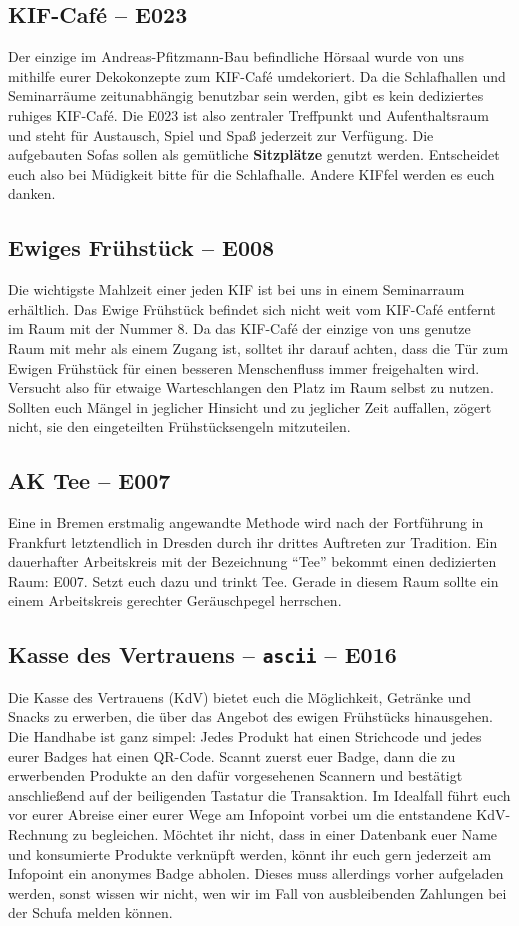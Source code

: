 \subsection*{KIF-Café -- E023}
Der einzige im Andreas-Pfitzmann-Bau befindliche Hörsaal wurde von uns mithilfe eurer Dekokonzepte zum KIF-Café umdekoriert.
Da die Schlafhallen und Seminarräume zeitunabhängig benutzbar sein werden, gibt es kein dediziertes ruhiges KIF-Café.
Die E023 ist also zentraler Treffpunkt und Aufenthaltsraum und steht für Austausch, Spiel und Spaß jederzeit zur Verfügung.
Die aufgebauten Sofas sollen als gemütliche \textbf{Sitzplätze} genutzt werden.
Entscheidet euch also bei Müdigkeit bitte für die Schlafhalle.
Andere KIFfel werden es euch danken.

\subsection*{Ewiges Frühstück -- E008}
Die wichtigste Mahlzeit einer jeden KIF ist bei uns in einem Seminarraum erhältlich.
Das Ewige Frühstück befindet sich nicht weit vom KIF-Café entfernt im Raum mit der Nummer 8.
Da das KIF-Café der einzige von uns genutze Raum mit mehr als einem Zugang ist, solltet ihr darauf achten, dass die Tür zum Ewigen Frühstück für einen besseren Menschenfluss immer freigehalten wird.
Versucht also für etwaige Warteschlangen den Platz im Raum selbst zu nutzen.
Sollten euch Mängel in jeglicher Hinsicht und zu jeglicher Zeit auffallen, zögert nicht, sie den eingeteilten Frühstücksengeln mitzuteilen.

\subsection*{AK Tee -- E007}
Eine in Bremen erstmalig angewandte Methode wird nach der Fortführung in Frankfurt letztendlich in Dresden durch ihr drittes Auftreten zur Tradition.
Ein dauerhafter Arbeitskreis mit der Bezeichnung \enquote{Tee} bekommt einen dedizierten Raum: E007.
Setzt euch dazu und trinkt Tee.
Gerade in diesem Raum sollte ein einem Arbeitskreis gerechter Geräuschpegel herrschen.

\subsection*{Kasse des Vertrauens -- \texttt{ascii} -- E016}
Die Kasse des Vertrauens (KdV) bietet euch die Möglichkeit, Getränke und Snacks zu erwerben, die über das Angebot des ewigen Frühstücks hinausgehen.
Die Handhabe ist ganz simpel: Jedes Produkt hat einen Strichcode und jedes eurer Badges hat einen QR-Code.
Scannt zuerst euer Badge, dann die zu erwerbenden Produkte an den dafür vorgesehenen Scannern und bestätigt anschließend auf der beiligenden Tastatur die Transaktion.
Im Idealfall führt euch vor eurer Abreise einer eurer Wege am Infopoint vorbei um die entstandene KdV-Rechnung zu begleichen.
Möchtet ihr nicht, dass in einer Datenbank euer Name und konsumierte Produkte verknüpft werden, könnt ihr euch gern jederzeit am Infopoint ein anonymes Badge abholen.
Dieses muss allerdings vorher aufgeladen werden, sonst wissen wir nicht, wen wir im Fall von ausbleibenden Zahlungen bei der Schufa melden können.

